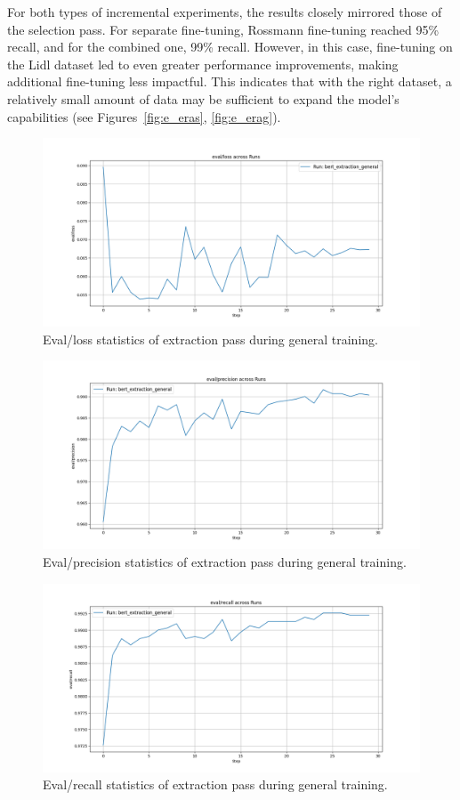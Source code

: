 \documentclass[licencjacka,en]{pracamgr}
\begin{document}
For both types of incremental experiments, the results closely mirrored those of the selection pass. For separate fine-tuning, Rossmann fine-tuning reached 95\% recall, and for the combined one, 99\% recall. However, in this case, fine-tuning on the Lidl dataset led to even greater performance improvements, making additional fine-tuning less impactful. This indicates that with the right dataset, a relatively small amount of data may be sufficient to expand the model’s capabilities (see Figures~\ref{fig:e_eras}, \ref{fig:e_erag}).

\begin{figure}[htbp]
    \centering
    \includegraphics[width=0.8\linewidth]{bachelor_images/bert_ft/e_elg.png}
    \caption{Eval/loss statistics of extraction pass during general training.}
    \label{fig:e_elg}
\end{figure}

\begin{figure}[htbp]
    \centering
    \includegraphics[width=0.8\linewidth]{bachelor_images/bert_ft/e_epg.png}
    \caption{Eval/precision statistics of extraction pass during general training.}
    \label{fig:e_epg}
\end{figure}

\begin{figure}[htbp]
    \centering
    \includegraphics[width=0.8\linewidth]{bachelor_images/bert_ft/e_erg.png}
    \caption{Eval/recall statistics of extraction pass during general training.}
    \label{fig:e_erg}
\end{figure}
\end{document}
